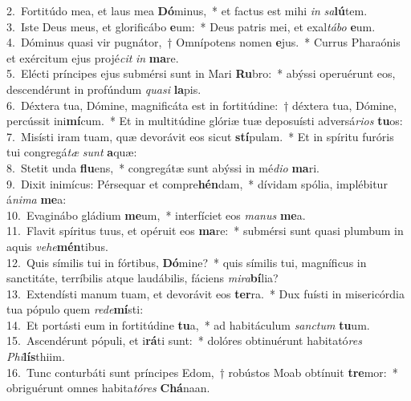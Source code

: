 {2.~}Fortitúdo mea, et laus mea \textbf{Dó}minus,~* et factus est mihi \textit{in} \textit{sa}\textbf{lú}tem.\\
{3.~}Iste Deus meus, et glorificábo \textbf{e}um:~* Deus patris mei, et exal\textit{tá}\textit{bo} \textbf{e}um.\\
{4.~}Dóminus quasi vir pugnátor,~† Omnípotens nomen \textbf{e}jus.~* Currus Pharaónis et exércitum ejus projé\textit{cit} \textit{in} \textbf{ma}re.\\
{5.~}Elécti príncipes ejus submérsi sunt in Mari \textbf{Ru}bro:~* abýssi operuérunt eos, descendérunt in profúndum \textit{qua}\textit{si} \textbf{la}pis.\\
{6.~}Déxtera tua, Dómine, magnificáta est in fortitúdine:~† déxtera tua, Dómine, percússit ini\textbf{mí}cum.~* Et in multitúdine glóriæ tuæ deposuísti adversá\textit{ri}\textit{os} \textbf{tu}os:\\
{7.~}Misísti iram tuam, quæ devorávit eos sicut \textbf{stí}pulam.~* Et in spíritu furóris tui congregá\textit{tæ} \textit{sunt} \textbf{a}quæ:\\
{8.~}Stetit unda \textbf{flu}ens,~* congregátæ sunt abýssi in mé\textit{di}\textit{o} \textbf{ma}ri.\\
{9.~}Dixit inimícus: Pérsequar et compre\textbf{hén}dam,~* dívidam spólia, implébitur á\textit{ni}\textit{ma} \textbf{me}a:\\
{10.~}Evaginábo gládium \textbf{me}um,~* interfíciet eos \textit{ma}\textit{nus} \textbf{me}a.\\
{11.~}Flavit spíritus tuus, et opéruit eos \textbf{ma}re:~* submérsi sunt quasi plumbum in aquis \textit{ve}\textit{he}\textbf{mén}tibus.\\
{12.~}Quis símilis tui in fórtibus, \textbf{Dó}mine?~* quis símilis tui, magníficus in sanctitáte, terríbilis atque laudábilis, fáciens \textit{mi}\textit{ra}\textbf{bí}lia?\\
{13.~}Extendísti manum tuam, et devorávit eos \textbf{ter}ra.~* Dux fuísti in misericórdia tua pópulo quem \textit{re}\textit{de}\textbf{mí}sti:\\
{14.~}Et portásti eum in fortitúdine \textbf{tu}a,~* ad habitáculum \textit{san}\textit{ctum} \textbf{tu}um.\\
{15.~}Ascendérunt pópuli, et i\textbf{rá}ti sunt:~* dolóres obtinuérunt habitató\textit{res} \textit{Phi}\textbf{lís}thiim.\\
{16.~}Tunc conturbáti sunt príncipes Edom,~† robústos Moab obtínuit \textbf{tre}mor:~* obriguérunt omnes habita\textit{tó}\textit{res} \textbf{Chá}naan.\\
